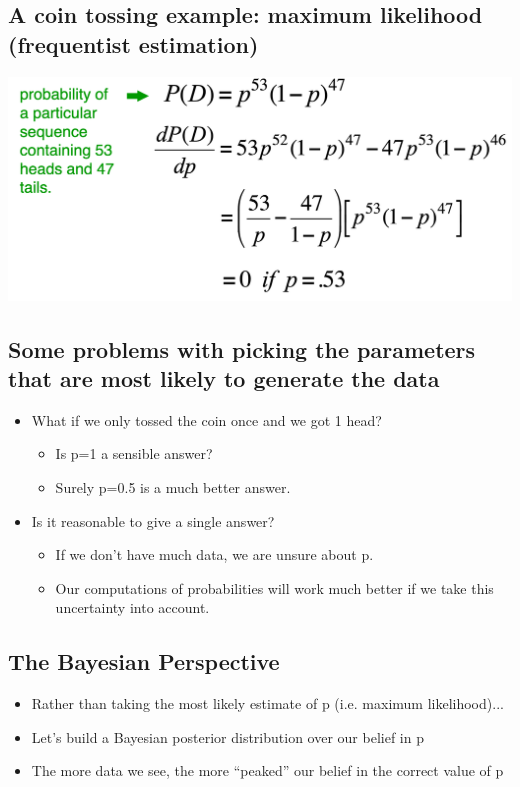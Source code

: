 \documentclass[11pt]{article}
\theoremstyle{definition}
\begin{document}
\subsection{A coin tossing example: maximum likelihood (frequentist estimation)}
\includegraphics[width=\textwidth/2]{4.png}

\subsection{Some problems with picking the parameters that
are most likely to generate the data}
\begin{itemize}
    \item What if we only
    tossed the coin once
    and we got 1 head?
    \begin{itemize}
        \item Is p=1 a sensible
        answer?
        \item Surely p=0.5 is a
        much better
        answer.
    \end{itemize}
    \item Is it reasonable to give a single
    answer?
    \begin{itemize}
        \item If we don’t have much data,
        we are unsure about p.
        \item Our computations of
        probabilities will work much
        better if we take this
        uncertainty into account.
    \end{itemize}
\end{itemize}

\subsection{The Bayesian Perspective}
\begin{itemize}
    \item Rather than taking the
    most likely estimate of p
    (i.e. maximum
    likelihood)...
    \item Let’s build a Bayesian
    posterior distribution
    over our belief in p
    \item The more data we see,
    the more “peaked” our
    belief in the correct
    value of p
\end{itemize}
\end{document}
